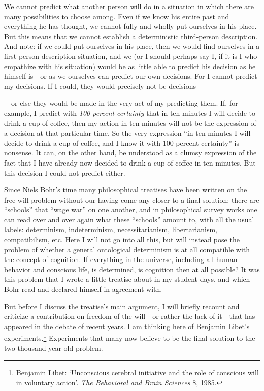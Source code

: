 \documentclass[12pt,a4paper]{book}
\begin{document}
We cannot predict what another person will do in a situation in which there are many possibilities to choose among. Even if we know his entire past and everything he has thought, we cannot fully and wholly put ourselves in his place. But this means that we cannot establish a deterministic third-person description. And note: if we could put ourselves in his place, then we would find ourselves in a first-person description situation, and we (or I should perhaps say I, if it is I who empathize with his situation) would be as little able to predict his decision as he himself is---or as we ourselves can predict our own decisions. For I cannot predict my decisions. If I could, they would precisely not be decisions

---or else they would be made in the very act of my predicting them. If, for example, I predict with \emph{100 percent certainty} that in ten minutes I will decide to drink a cup of coffee, then my action in ten minutes will not be the expression of a decision at that particular time. So the very expression ``in ten minutes I will decide to drink a cup of coffee, and I know it with 100 percent certainty'' is nonsense. It can, on the other hand, be understood as a clumsy expression of the fact that I have already now decided to drink a cup of coffee in ten minutes. But this decision I could not predict either.

Since Niels Bohr's time many philosophical treatises have been written on the free-will problem without our having come any closer to a final solution; there are ``schools'' that ``wage war'' on one another, and in philosophical survey works one can read over and over again what these ``schools'' amount to, with all the usual labels: determinism, indeterminism, necessitarianism, libertarianism, compatibilism, etc. Here I will not go into all this, but will instead pose the problem of whether a general ontological determinism is at all compatible with the concept of cognition. If everything in the universe, including all human behavior and conscious life, is determined, is cognition then at all possible? It was this problem that I wrote a little treatise about in my student days, and which Bohr read and declared himself in agreement with.

But before I discuss the treatise's main argument, I will briefly recount and criticize a contribution on freedom of the will---or rather the lack of it---that has appeared in the debate of recent years. I am thinking here of Benjamin Libet's experiments.\footnote{Benjamin Libet: `Unconscious cerebral initiative and the role of conscious will in voluntary action'. \emph{The Behavioral and Brain Sciences} 8, 1985.} Experiments that many now believe to be the final solution to the two-thousand-year-old problem.
\end{document}
